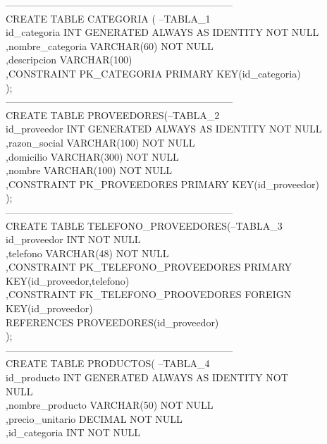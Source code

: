 \documentclass[10pt]{report}
\begin{document}
\begin{flushleft}
	---------------------------------------------------------------------\\
	CREATE TABLE CATEGORIA ( --TABLA\_1\\
		 id\_categoria	  INT GENERATED ALWAYS AS IDENTITY NOT NULL\\
		,nombre\_categoria VARCHAR(60)		NOT NULL\\
		,descripcion      VARCHAR(100) \\
		,CONSTRAINT PK\_CATEGORIA PRIMARY KEY(id\_categoria)\\
	);\\
	---------------------------------------------------------------------\\
	CREATE TABLE PROVEEDORES(--TABLA\_2\\
		 id\_proveedor INT GENERATED ALWAYS AS IDENTITY NOT NULL\\
		,razon\_social VARCHAR(100)		NOT NULL\\
		,domicilio	  VARCHAR(300)		NOT NULL\\
		,nombre		  VARCHAR(100)		NOT NULL\\
		,CONSTRAINT PK\_PROVEEDORES PRIMARY KEY(id\_proveedor)\\
	);\\
	---------------------------------------------------------------------\\
	CREATE TABLE TELEFONO\_PROVEEDORES(--TABLA\_3\\
		 id\_proveedor INT				NOT NULL\\
		,telefono	  VARCHAR(48)		NOT NULL\\
		,CONSTRAINT PK\_TELEFONO\_PROVEEDORES PRIMARY\\ KEY(id\_proveedor,telefono)\\
		,CONSTRAINT FK\_TELEFONO\_PROOVEDORES FOREIGN\\ KEY(id\_proveedor)\\
		 REFERENCES PROVEEDORES(id\_proveedor)\\
	);\\
	---------------------------------------------------------------------\\
	CREATE TABLE PRODUCTOS( --TABLA\_4\\
		 id\_producto        INT GENERATED ALWAYS AS IDENTITY NOT\\ NULL\\
		,nombre\_producto	VARCHAR(50)		  NOT NULL\\		
		,precio\_unitario 	DECIMAL	 		  NOT NULL\\	
		,id\_categoria       INT				  NOT NULL\\

\end{flushleft}
\end{document}
